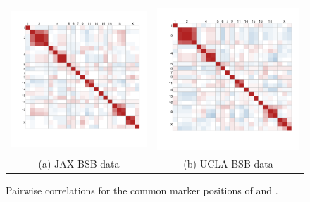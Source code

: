 \documentclass[sts]{imsart}
\begin{document}
\begin{figure}[b]
  \begin{center}
    \begin{tabular}{cc}
      \includegraphics[scale = 0.2]{../img/jaxbsb_common.png} &
      \includegraphics[scale = 0.2]{../img/uclabsb_common.png} \\
      {\footnotesize (a) JAX BSB data} &
      {\footnotesize (b) UCLA BSB data} \\
    \end{tabular}
  \end{center}
  \caption{Pairwise correlations for the common marker positions of \cite{roweetal1994jaxbsb} and \cite{welchetal1996uclabsb}.}
  \label{fig:bsbcommon}
\end{figure}
\end{document}
